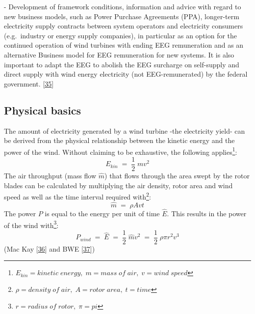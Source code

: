 \documentclass[a4paper,11pt]{article}
\begin{document}
- Development of framework conditions, information and advice with regard to new business models, such as Power Purchase Agreements (PPA), longer-term electricity supply contracts between system operators and electricity consumers (e.g.~industry or energy supply companies), in particular as an option for the continued operation of wind turbines with ending EEG remuneration and as an alternative Business model for EEG remuneration for new systems. It is also important to adapt the EEG to abolish the EEG surcharge on self-supply and direct supply with wind energy electricity (not EEG-remunerated) by the federal government.
{[}\protect\hyperlink{ref-MinisteriumfurUmweltEnergieErnahrungundForsten.2020}{35}{]}

\hypertarget{physical-basics}{%
\subsection{Physical basics}\label{physical-basics}}

The amount of electricity generated by a wind turbine -the electricity yield- can be derived from the physical relationship between the kinetic energy and the power of the wind. Without claiming to be exhaustive, the following applies\footnote{\(E_{kin}= kinetic\; energy,\; m=mass\; of\; air,\; v= wind\;speed\)}:
\begin{equation}
E_{kin}\; =\; \frac{1}{2}\;mv^2
\end{equation}
The air throughput (mass flow \(\hat{m}\)) that flows through the area swept by the rotor blades can be calculated by multiplying the air density, rotor area and wind speed as well as the time interval required with\footnote{\(\rho= density\; of\; air,\; A= rotor\; area,\; t=time\)}:
\begin{equation}
\hat{m}\;=\;\rho A vt
\end{equation}
The power \(P\) is equal to the energy per unit of time \(\hat{E}\). This results in the power of the wind with\footnote{\(r= radius\; of\; rotor, \; \pi=pi\)}:
\begin{equation}
P_{wind}\;=\;\hat{E}\;=\;\frac{1}{2}\;\hat{m}v^2\;=\;\frac{1}{2}\; \rho \pi r^2 v^3
\end{equation}
(Mac Kay {[}\protect\hyperlink{ref-DavidJCMacKay.2009}{36}{]} and BWE {[}\protect\hyperlink{ref-BWE.2021}{37}{]})
\end{document}
